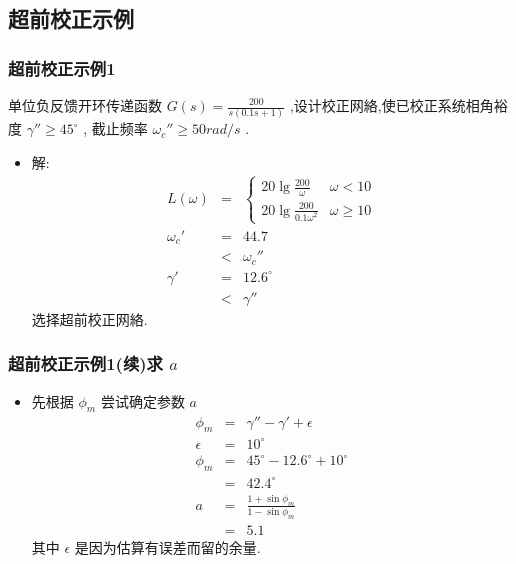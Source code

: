 \documentclass[table]{article}
\begin{document}
\subsection{超前校正示例}
\label{sec-2-2}
\begin{frame}
\frametitle{超前校正示例1}
\label{sec-2-2-1}

单位负反馈开环传递函数  $G(s)=\frac{200}{s(0.1s+1)}$ ,设计校正网絡,使已校正系统相角裕度  $\gamma''\geq 45^{\circ}$ , 截止频率  $\omega_c''\geq 50 rad/s$  .

\begin{itemize}
\item <2->解:
      \begin{eqnarray*}
       L(\omega) & = &\begin{cases} 20\lg\frac{200}{\omega} & \omega < 10 \\
      20\lg\frac{200}{0.1\omega^2} & \omega\geq 10
      \end{cases} \\
      \omega_c' &=& 44.7 \\
        &<& \omega_c'' \\
      \gamma' &=& 12.6^{\circ} \\
       &<& \gamma''
      \end{eqnarray*}
      选择超前校正网絡.
\end{itemize}
\end{frame}
\begin{frame}
\frametitle{超前校正示例1(续)求 $a$}
\label{sec-2-2-2}

\begin{itemize}
\item 先根据 $\phi_m$ 尝试确定参数  $a$ 
       \begin{eqnarray*}
       \phi_m & = &\gamma''-\gamma'+\epsilon \\
       \epsilon &=& 10^{\circ} \\
       \phi_{m} &=& 45^{\circ}-12.6^{\circ}+10^{\circ} \\
       	&=& 42.4^{\circ} \\
       a &=& \frac{1+\sin\phi_m}{1-\sin\phi_m} \\
       	&=& 5.1
       \end{eqnarray*}
       其中  $\epsilon$  是因为估算有误差而留的余量.
\end{itemize}
\end{frame}
\end{document}
